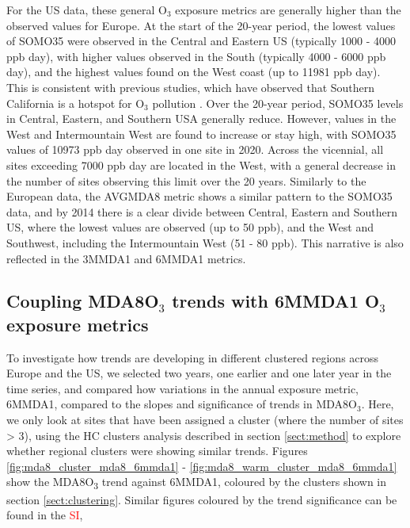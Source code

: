 \documentclass[journal abbreviation, manuscript]{copernicus}
\begin{document}
For the US data, these general O$_3$ exposure metrics are generally higher than the observed values for Europe. At the start of the 20-year period, the lowest values of SOMO35 were observed in the Central and Eastern US (typically 1000 - 4000 ppb day), with higher values observed in the South (typically 4000 - 6000 ppb day), and the highest values found on the West coast (up to 11981 ppb day). This is consistent with previous studies, which have observed that Southern California is a hotspot for O$_3$ pollution \citep{fleming_2018, WangKeding2024}. Over the 20-year period, SOMO35 levels in Central, Eastern, and Southern USA generally reduce. However, values in the West and Intermountain West are found to increase or stay high, with SOMO35 values of 10973 ppb day observed in one site in 2020. Across the vicennial, all sites exceeding 7000 ppb day are located in the West, with a general decrease in the number of sites observing this limit over the 20 years. Similarly to the European data, the AVGMDA8 metric shows a similar pattern to the SOMO35 data, and by 2014 there is a clear divide between Central, Eastern and Southern US, where the lowest values are observed (up to 50 ppb), and the West and Southwest, including the Intermountain West (51 - 80 ppb). This narrative is also reflected in the 3MMDA1 and 6MMDA1 metrics.

\subsection{Coupling MDA8O$_3$ trends with 6MMDA1 O$_3$ exposure metrics} \label{sect:polluted_stuff}

To investigate how trends are developing in different clustered regions across Europe and the US, we selected two years, one earlier and one later year in the time series, and compared how variations in the annual exposure metric, 6MMDA1, compared to the slopes and significance of trends in MDA8O$_3$. Here, we only look at sites that have been assigned a cluster (where the number of sites > 3), using the HC clusters analysis described in section \ref{sect:method} to explore whether regional clusters were showing similar trends. Figures \ref{fig:mda8_cluster_mda8_6mmda1} - \ref{fig:mda8_warm_cluster_mda8_6mmda1} show the MDA8O\textsubscript{3} trend against 6MMDA1, coloured by the clusters shown in section \ref{sect:clustering}. Similar figures coloured by the trend significance can be found in the \textcolor{red}{SI},
\end{document}

